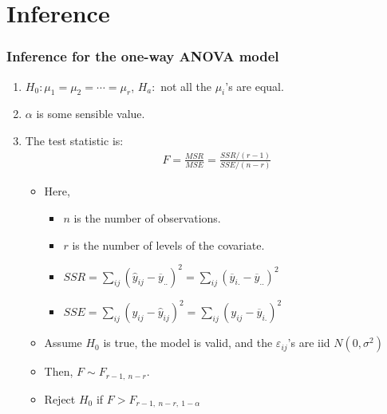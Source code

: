 \documentclass[handout]{beamer}\usepackage[]{graphicx}\usepackage[]{color}
\providecommand{\e}{\varepsilon}
\providecommand{\ov}[1]{\overline{#1}}
\providecommand{\wh}[1]{\widehat{#1}}
\numberwithin{equation}{section}
\begin{document}
\section{Inference}


\begin{frame}
\frametitle{Inference for the one-way ANOVA model}
\begin{enumerate}[1. ]
\item $H_0: \mu_1 = \mu_2 = \cdots = \mu_r$, $H_a:$ not all the $\mu_i$'s are equal.
\pause \item $\alpha$ is some sensible value.
\pause \item The test statistic is:
\pause \begin{align*}
F = \frac{MSR}{MSE} = \frac{SSR/(r-1)}{SSE/(n-r)}
\end{align*}
\begin{itemize}
\item Here,
\begin{itemize}
\pause \item $n$ is the number of observations.
\pause \item $r$ is the number of levels of the covariate.
\pause \item $SSR = \sum_{ij} (\wh{y}_{ij} - \ov{y}_{..})^2 = \sum_{ij} (\ov{y}_{i.} - \ov{y}_{..})^2 $
\pause \item $SSE = \sum_{ij} ({y_{ij} - \wh{y}_{ij}})^2 = \sum_{ij} (y_{ij} - \ov{y}_{i.})^2$
\end{itemize}
\pause \item Assume $H_0$ is true, the model is valid, and the $\e_{ij}$'s are iid $N(0, \sigma^2)$
\pause \item Then, $F \sim F_{r -1, \ n - r}$. 
\pause \item Reject $H_0$ if $F > F_{r - 1, \ n - r, \ 1 - \alpha}$
\end{itemize}
\end{enumerate}
\end{frame}
\end{document}

